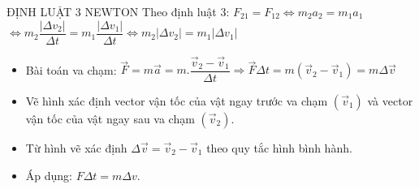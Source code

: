 \begin{dang}{ĐỊNH LUẬT 3 NEWTON}
Theo định luật 3: $ {F}_{21}={F}_{12}\Leftrightarrow {m}_{2}{a}_{2}={m}_{1}{a}_{1}$
$ \Leftrightarrow {m}_{2}\dfrac{\left|\Delta {v}_{2}\right|}{\Delta t}={m}_{1}\dfrac{\left|\Delta {v}_{1}\right|}{\Delta t}\Leftrightarrow {m}_{2}\left|\Delta {v}_{2}\right|={m}_{1}\left|\Delta {v}_{1}\right|$
\begin{itemize}
\item Bài toán va chạm: $\vec{F}=m\vec{a}=m.\dfrac{\vec{v}_2-\vec{v}_1}{\Delta t} \Rightarrow \vec{F}\Delta t=m\left(\vec{v}_2-\vec{v}_1\right)=m\Delta \vec{v}$ 
\item Vẽ hình xác định vector vận tốc của vật ngay trước va chạm $\left( \vec{v}_1 \right)$ và vector vận tốc của vật ngay sau va chạm $\left( \vec{v}_2 \right)$.
\item Từ hình vẽ xác định $\Delta \vec{v}=\vec{v}_2-\vec{v}_1$ theo quy tắc hình bình hành.
\item Áp dụng: $F\Delta t=m\Delta v$.
\end{itemize}
\end{dang}
